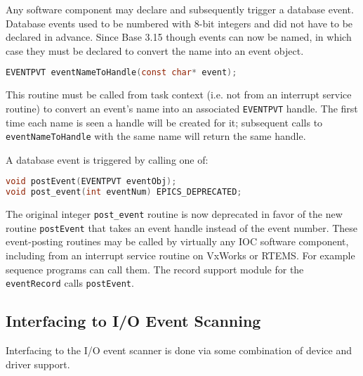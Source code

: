 Any software component may declare and subsequently trigger a database event.
Database events used to be numbered with 8-bit integers and did not have to be declared in advance.
Since Base 3.15 though events can now be named, in which case they must be declared to convert the name into an event object.

\begin{lstlisting}[language=C]
EVENTPVT eventNameToHandle(const char* event);
\end{lstlisting}

This routine must be called from task context (i.e. not from an interrupt service routine) to convert an event's name into an associated \verb|EVENTPVT| handle.
The first time each name is seen a handle will be created for it; subsequent calls to \verb|eventNameToHandle| with the same name will return the same handle.

A database event is triggered by calling one of:

\begin{lstlisting}[language=C]
void postEvent(EVENTPVT eventObj);
void post_event(int eventNum) EPICS_DEPRECATED;
\end{lstlisting}

The original integer \verb|post_event| routine is now deprecated in favor of the new routine \verb|postEvent| that takes an event handle instead of the event number.
These event-posting routines may be called by virtually any IOC software component, including from an interrupt service routine on VxWorks or RTEMS.
For example sequence programs can call them.
The record support module for the \verb|eventRecord| calls \verb|postEvent|.

\subsection{Interfacing to I/O Event Scanning}


Interfacing to the I/O event scanner is done via some combination of device and driver support.


